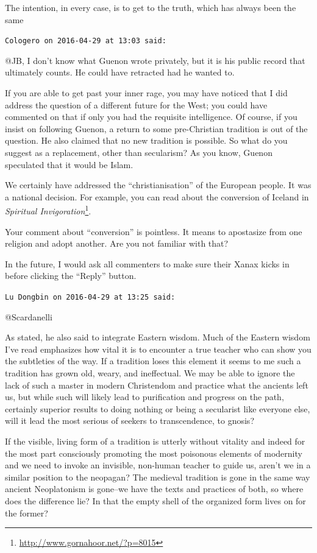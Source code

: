 \begin{footnotesize}
\begin{sffamily}
The intention, in every case, is to get to the truth, which has always been the same

\hfill

\texttt{Cologero on 2016-04-29 at 13:03 said:}

@JB, I don't know what Guenon wrote privately, but it is his public record that ultimately counts. He could have retracted had he wanted to.

If you are able to get past your inner rage, you may have noticed that I did address the question of a different future for the West; you could have commented on that if only you had the requisite intelligence. Of course, if you insist on following Guenon, a return to some pre-Christian tradition is out of the question. He also claimed that no new tradition is possible. So what do you suggest as a replacement, other than secularism? As you know, Guenon speculated that it would be Islam.

We certainly have addressed the ``christianisation'' of the European people. It was a national decision. For example, you can read about the conversion of Iceland in \textit{Spiritual Invigoration}\footnote{\url{http://www.gornahoor.net/?p=8015}}.

Your comment about ``conversion'' is pointless. It means to apostasize from one religion and adopt another. Are you not familiar with that?

In the future, I would ask all commenters to make sure their Xanax kicks in before clicking the ``Reply'' button.

\hfill

\texttt{Lu Dongbin on 2016-04-29 at 13:25 said:}

@Scardanelli

As stated, he also said to integrate Eastern wisdom. Much of the Eastern wisdom I've read emphasizes how vital it is to encounter a true teacher who can show you the subtleties of the way. If a tradition loses this element it seems to me such a tradition has grown old, weary, and ineffectual. We may be able to ignore the lack of such a master in modern Christendom and practice what the ancients left us, but while such will likely lead to purification and progress on the path, certainly superior results to doing nothing or being a secularist like everyone else, will it lead the most serious of seekers to transcendence, to gnosis?

If the visible, living form of a tradition is utterly without vitality and indeed for the most part consciously promoting the most poisonous elements of modernity and we need to invoke an invisible, non-human teacher to guide us, aren't we in a similar position to the neopagan? The medieval tradition is gone in the same way ancient Neoplatonism is gone--we have the texts and practices of both, so where does the difference lie? In that the empty shell of the organized form lives on for the former?


\end{sffamily}
\end{footnotesize}
